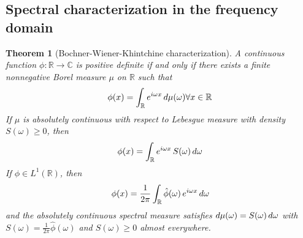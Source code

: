\documentclass{article}
\newtheorem{theorem}{Theorem}
\begin{document}
\subsection{Spectral characterization in the frequency domain}

\begin{theorem}[Bochner-Wiener-Khintchine characterization]
  A continuous function $\phi : \mathbb{R} \to \mathbb{C}$ is positive
  definite if and only if there exists a finite nonnegative Borel measure
  $\mu$ on $\mathbb{R}$ such that
  \begin{equation}
    \phi (x) = \int_{\mathbb{R}} e^{i \omega x}  \hspace{0.17em} d \mu
    (\omega) \forall x \in \mathbb{R}
  \end{equation}
  If $\mu$ is absolutely continuous with respect to Lebesgue measure with
  density $S (\omega) \ge 0$, then
  \begin{equation}
    \phi (x) = \int_{\mathbb{R}} e^{i \omega x}  \hspace{0.17em} S (\omega) 
    \hspace{0.17em} d \omega
  \end{equation}
  If $\phi \in L^1 (\mathbb{R})$, then
  \begin{equation}
    \phi (x) = \frac{1}{2 \pi}  \int_{\mathbb{R}} \hat{\phi} (\omega) 
    \hspace{0.17em} e^{i \omega x}  \hspace{0.17em} d \omega
  \end{equation}
  and the absolutely continuous spectral measure satisfies $d \mu (\omega) = S
  (\omega)  \hspace{0.17em} d \omega$ with $S (\omega) = \frac{1}{2 \pi} 
  \hat{\phi} (\omega)$ and $S (\omega) \ge 0$ almost everywhere.
\end{theorem}
\end{document}
